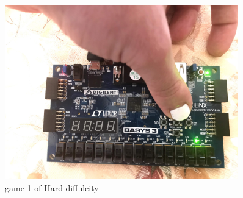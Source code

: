 \documentclass[11pt]{article}
\begin{document}
\begin{figure}[ht]\centering
	\includegraphics[width=0.9\textwidth]{IMG_1301.jpg}
	\caption{game 1 of Hard diffulcity }
	\label{fig:sim_with_table}
\end{figure}
\end{document}
